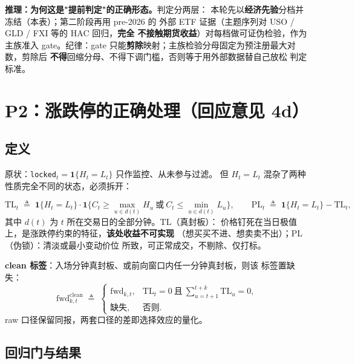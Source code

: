 \documentclass[11pt, a4paper]{ctexart}
\newcommand{\code}[1]{\texttt{\small #1}}
\newcommand{\eqdef}{\;\triangleq\;}
\begin{document}
\begin{table}[h!]\centering\small
\caption{映射强度表：166 个 (主题, 品种) 对的档位分布。72/88 品种被
映射；16 个无合理机制的品种（苹果、红枣、鸡蛋、生猪、白糖等）诚实
留在未映射池、不进任何检验族}

\end{table}

\noindent\textbf{推理：为何这是"提前判定"的正确形态。}判定分两层：
本轮先以\textbf{经济先验}分档并冻结（本表）；第二阶段再用 pre-2026 的
外部 ETF 证据（主题序列对 USO / GLD / FXI 等的 HAC 回归，\textbf{完全
不接触期货收益}）对每档做可证伪检验，作为主族准入 gate。纪律：gate
只能\textbf{剪除}映射；主族检验分母固定为预注册最大对数，剪除后
\textbf{不得}回缩分母、不得下调门槛，否则等于用外部数据替自己放松
判定标准。

\section{P2：涨跌停的正确处理（回应意见 4d）}\label{sec:p2}

\subsection{定义}

原状：\code{locked}$_t=\mathbf{1}\{H_t=L_t\}$ 只作监控、从未参与过滤。
但 $H_t=L_t$ 混杂了两种性质完全不同的状态，必须拆开：

\[
\mathrm{TL}_t \eqdef \mathbf{1}\{H_t = L_t\}\cdot
\mathbf{1}\Big\{C_t \ge \max_{u\in d(t)} H_u \ \text{或}\
C_t \le \min_{u\in d(t)} L_u\Big\},
\qquad
\mathrm{PL}_t \eqdef \mathbf{1}\{H_t = L_t\} - \mathrm{TL}_t,
\]
其中 $d(t)$ 为 $t$ 所在交易日的全部分钟。$\mathrm{TL}$（真封板）：
价格钉死在当日极值上，是涨跌停约束的特征，\textbf{该处收益不可实现}
（想买买不进、想卖卖不出）；$\mathrm{PL}$（伪锁）：清淡或最小变动价位
所致，可正常成交，不剔除、仅打标。

\textbf{clean 标签}：入场分钟真封板、或前向窗口内任一分钟真封板，则该
标签置缺失：
\[
\mathrm{fwd}^{\mathrm{clean}}_{k,t} \eqdef
\begin{cases}
\mathrm{fwd}_{k,t}, & \mathrm{TL}_t=0\ \text{且}\
\sum_{u=t+1}^{t+k}\mathrm{TL}_u=0,\\
\text{缺失}, & \text{否则}.
\end{cases}
\]
raw 口径保留同报，两套口径的差即选择效应的量化。

\subsection{回归门与结果}
\end{document}
